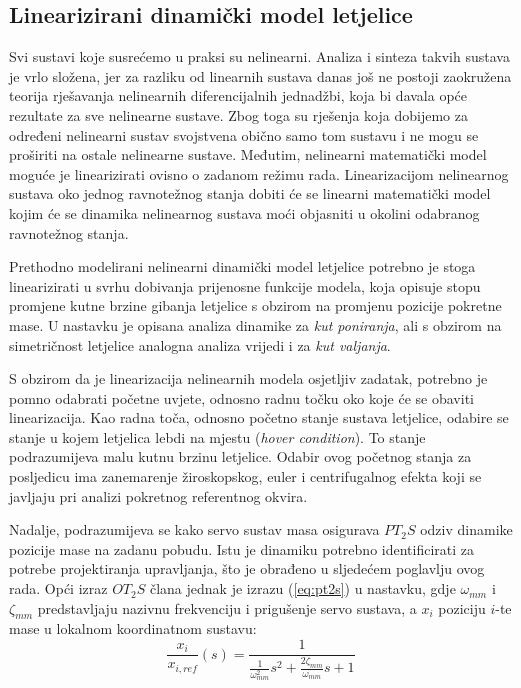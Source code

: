 \documentclass[11pt,a4paper]{article}
\begin{document}
\subsection{Linearizirani dinamički model letjelice}

Svi sustavi koje susrećemo u praksi su nelinearni. Analiza i sinteza takvih sustava je vrlo složena, jer za razliku od linearnih sustava danas još ne postoji zaokružena teorija rješavanja nelinearnih diferencijalnih jednadžbi, koja bi davala opće rezultate za sve nelinearne sustave. Zbog toga su rješenja koja dobijemo za određeni nelinearni sustav svojstvena obično samo tom sustavu i ne mogu se proširiti na ostale nelinearne sustave. Međutim, nelinearni matematički model moguće je linearizirati ovisno o zadanom režimu rada. Linearizacijom nelinearnog sustava oko jednog ravnotežnog stanja dobiti će se linearni matematički model kojim će se dinamika nelinearnog sustava moći objasniti u okolini odabranog ravnotežnog stanja. \cite{vukic}

\medskip

Prethodno modelirani nelinearni dinamički model letjelice potrebno je stoga linearizirati u svrhu dobivanja prijenosne funkcije modela, koja opisuje stopu promjene kutne brzine gibanja letjelice s obzirom na promjenu pozicije pokretne mase. U nastavku je opisana analiza dinamike za \textit{kut poniranja}, ali s obzirom na simetričnost letjelice analogna analiza vrijedi i za \textit{kut valjanja}. 

\medskip

S obzirom da je linearizacija nelinearnih modela osjetljiv zadatak, potrebno je pomno odabrati početne uvjete, odnosno radnu točku oko koje će se obaviti linearizacija. Kao radna toča, odnosno početno stanje sustava letjelice, odabire se stanje u kojem letjelica lebdi na mjestu (\textit{hover condition}). To stanje podrazumijeva malu kutnu brzinu letjelice. Odabir ovog početnog stanja za posljedicu ima zanemarenje žiroskopskog, euler i centrifugalnog efekta koji se javljaju pri analizi pokretnog referentnog okvira. 

\medskip

Nadalje, podrazumijeva se kako servo sustav masa osigurava $PT_{2}S$ odziv dinamike pozicije mase na zadanu pobudu. Istu je dinamiku potrebno identificirati za potrebe projektiranja upravljanja, što je obrađeno u sljedećem poglavlju ovog rada. Opći izraz $OT_{2}S$ člana jednak je izrazu (\ref{eq:pt2s}) u nastavku, gdje $\omega_{mm}$ i $\zeta_{mm}$ predstavljaju nazivnu frekvenciju i prigušenje servo sustava, a $x_{i}$ poziciju $i$-te mase u lokalnom koordinatnom sustavu:
\begin{equation}
\frac{x_{i}}{x_{i, ref}}(s) = \frac{1}{\frac{1}{\omega_{mm}^{2}}s^{2} + \frac{2\zeta_{mm}}{\omega_{mm}}s + 1 }
\label{eq:pt2s}
\end{equation}
\end{document}
